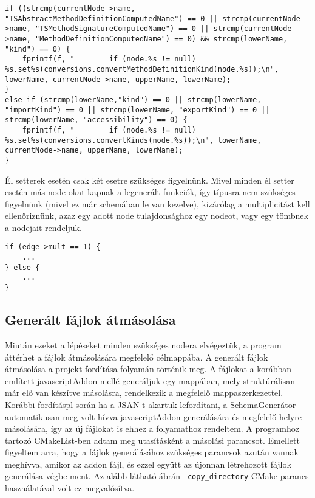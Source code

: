 \begin{lstlisting}[caption={Attribútum szűrésről példa},label={lst:attributefilter}, style={CStyle}]
if ((strcmp(currentNode->name, "TSAbstractMethodDefinitionComputedName") == 0 || strcmp(currentNode->name, "TSMethodSignatureComputedName") == 0 || strcmp(currentNode->name, "MethodDefinitionComputedName") == 0) && strcmp(lowerName, "kind") == 0) {
    fprintf(f, "        if (node.%s != null) %s.set%s(conversions.convertMethodDefinitionKind(node.%s));\n", lowerName, currentNode->name, upperName, lowerName);
}
else if (strcmp(lowerName,"kind") == 0 || strcmp(lowerName, "importKind") == 0 || strcmp(lowerName, "exportKind") == 0 || strcmp(lowerName, "accessibility") == 0) {
    fprintf(f, "        if (node.%s != null) %s.set%s(conversions.convertKinds(node.%s));\n", lowerName, currentNode->name, upperName, lowerName);
}
\end{lstlisting}

Él setterek esetén csak két esetre szükséges figyelnünk. Mivel minden él setter esetén más node-okat kapnak a legenerált funkciók, így típusra nem szükséges figyelnünk (mivel ez már schemában le van kezelve), kizárólag a multiplicitást kell ellenőriznünk, azaz egy adott node tulajdonsághoz egy nodeot, vagy egy tömbnek a nodejait rendeljük.

\begin{lstlisting}[caption={Él szetterek fájlba írása},label={lst:edgefilter}, style={CStyle}]
if (edge->mult == 1) {
    ...
} else {
    ...
}
\end{lstlisting}

\subsection{Generált fájlok átmásolása}

Miután ezeket a lépéseket minden szükséges nodera elvégeztük, a program áttérhet a fájlok átmásolására megfelelő célmappába.
A generált fájlok átmásolása a projekt fordítása folyamán történik meg. A fájlokat a korábban említett javascriptAddon mellé generáljuk egy mappában, mely struktúrálisan már elő van készítve másolásra, rendelkezik a megfelelő mappaszerkezettel. Korábbi fordításpl során ha a JSAN-t akartuk lefordítani, a SchemaGenerátor automatikusan meg volt hívva javascriptAddon generálására és megfelelő helyre másolására, így az új fájlokat is ehhez a folyamathoz rendeltem. A programhoz tartozó CMakeList-ben adtam meg utasításként a másolási parancsot. Emellett figyeltem arra, hogy a fájlok generálásához szükséges parancsok azután vannak meghívva, amikor az addon fájl, és ezzel együtt az újonnan létrehozott fájlok generálása végbe ment.
Az alább látható ábrán \texttt{-copy\_directory} CMake parancs használatával volt ez megvalósítva.


